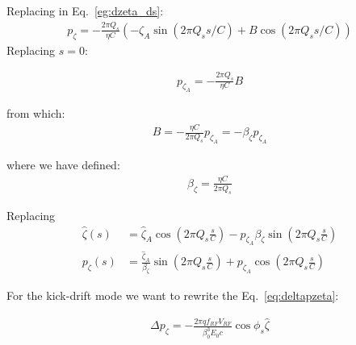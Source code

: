 Replacing in Eq.~\ref{eg:dzeta_ds}:
\begin{align}
p_\zeta = - \frac{2\pi Q_s} {\eta C} \left( -\zeta_A \sin\left( 2 \pi Q_s s/C\right) + B \cos\left( 2 \pi Q_s s/C \right)\right)
\end{align}
Replacing $s=0$:

\begin{align}
p_{\zeta_A} = - \frac{2\pi Q_s} {\eta C} B
\end{align}

from which:
\begin{align}
B = -\frac{\eta C}{2\pi Q_s}p_{\zeta_A} = -\beta_\zeta p_{\zeta_A}
\end{align}

where we have defined:
\begin{align}
\beta_\zeta = \frac{\eta C}{2\pi Q_s}
\end{align}

Replacing
\begin{align}
\hat{\zeta}(s) &= \hat{\zeta}_A \cos\left( 2 \pi Q_s \frac{s}{C}\right) -p_{\zeta_A} \beta_\zeta \sin\left( 2 \pi Q_s \frac{s}{C} \right)\\
p_\zeta(s) &= \frac{\hat{\zeta}_A}{\beta_\zeta} \sin\left( 2 \pi Q_s \frac{s}{C}\right)
           + p_{\zeta_A} \cos\left( 2 \pi Q_s \frac{s}{C}\right)
\end{align}

For the kick-drift mode we want to rewrite the Eq.~\ref{eq:deltapzeta}:

\begin{align}
\Delta {p}_\zeta =-\frac{2\pi q f_{RF} V_{RF}}{\beta_0^3 E_0 c}\cos{\phi_s}\hat{\zeta}
\end{align}
